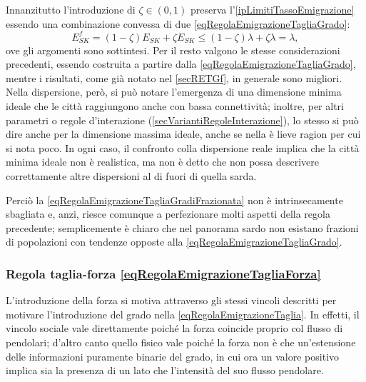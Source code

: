         Innanzitutto l'introduzione di \(\zeta\in(0,1)\) preserva l'\cref{ipLimitiTassoEmigrazione} essendo una combinazione convessa\footnotemark{} di due \ref{eqRegolaEmigrazioneTagliaGrado}:
        \[
          E^f_{SK}=(1-\zeta)E_{SK}+\zeta E_{SK}\leq(1-\zeta)\lambda+\zeta\lambda=\lambda,
        \]
        ove gli argomenti sono sottintesi. Per il resto valgono le stesse considerazioni precedenti, essendo costruita a partire dalla \ref{eqRegolaEmigrazioneTagliaGrado}, mentre i risultati, come già notato nel \cref{secRETGf}, in generale sono migliori. Nella dispersione, però, si può notare l'emergenza di una dimensione minima ideale che le città raggiungono anche con bassa connettività; inoltre, per altri parametri o regole d'interazione (\cref{secVariantiRegoleInterazione}), lo stesso si può dire anche per la dimensione massima ideale, anche se nella  è lieve ragion per cui si nota poco. In ogni caso, il confronto colla dispersione reale implica che la città minima ideale non è realistica, ma non è detto che non possa descrivere correttamente altre dispersioni al di fuori di quella sarda.
        
        Perciò la \ref{eqRegolaEmigrazioneTagliaGradiFrazionata} non è intrinsecamente sbagliata e, anzi, riesce comunque a perfezionare molti aspetti della regola precedente; semplicemente è chiaro che nel panorama sardo non esistano frazioni di popolazioni con tendenze opposte alla \ref{eqRegolaEmigrazioneTagliaGrado}.

      \subsubsection{Regola taglia-forza \ref{eqRegolaEmigrazioneTagliaForza}}

        L'introduzione della forza si motiva attraverso gli stessi vincoli descritti per motivare l'introduzione del grado nella \ref{eqRegolaEmigrazioneTaglia}. In effetti, il vincolo sociale vale direttamente poiché la forza coincide proprio col flusso di pendolari; d'altro canto quello fisico vale poiché la forza non è che un'estensione delle informazioni puramente binarie del grado, in cui ora un valore positivo implica sia la presenza di un lato che l'intensità del suo flusso pendolare.
        
